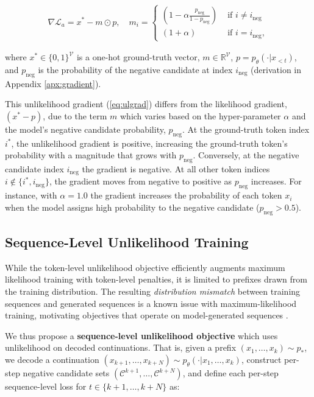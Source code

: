\begin{align}
\label{eq:ulgrad}
\nabla\mathcal{L}_a = x^* - m\odot p, \quad m_i =\begin{cases} (1-\alpha\frac{p_{\text{neg}}}{1-p_{\text{neg}}}) & \text{ if } i\neq i_{\text{neg}}\\
    (1+\alpha) & \text{ if } i=i_{\text{neg}},
    \end{cases} 
\end{align}

where $x^*\in\{0,1\}^\mathcal{V}$ is a one-hot ground-truth vector, $m\in \mathbb{R}^\mathcal{V}$, $p=p_{\theta}(\cdot|x_{<t})$, and $p_{\text{neg}}$ is the probability of the negative candidate at index $i_{\text{neg}}$ (derivation in Appendix \ref{apx:gradient}).

This unlikelihood gradient (\ref{eq:ulgrad}) differs from the likelihood gradient, $(x^*-p)$, due to the term $m$ which varies based on the hyper-parameter $\alpha$ and the model's negative candidate probability, $p_{\text{neg}}$. At the ground-truth token index $i^*$, the unlikelihood gradient is positive, increasing the ground-truth token's probability with a magnitude that grows with $p_{\text{neg}}$. Conversely, at the negative candidate index $i_{\text{neg}}$ the gradient is negative.  At all other token indices $i\not\in \{i^*,i_{\text{neg}}\}$, the gradient moves from negative to positive as $p_{\text{neg}}$ increases. For instance, with $\alpha=1.0$ the gradient increases the probability of each token $x_i$ when the model assigns high probability to the negative candidate ($p_{\text{neg}}>0.5$).

\subsection{Sequence-Level Unlikelihood Training}
\label{ssec:seq-obj} 

While the token-level unlikelihood objective efficiently augments maximum likelihood training with token-level penalties, it is limited to prefixes drawn from the training distribution. The resulting \textit{distribution mismatch} between training sequences and generated sequences is a known issue with maximum-likelihood training, motivating objectives that operate on model-generated sequences \citep{daume2009search,ross2011reduction,ranzato2015sequence,yu2016seqgan}.

We thus propose a \textbf{sequence-level unlikelihood objective} which uses unlikelihood on decoded continuations. That is, given a prefix $(x_1,\ldots,x_k)\sim p_*$, we decode a continuation $(x_{k+1},\ldots,x_{k+N})\sim p_{\theta}(\cdot | x_1,\ldots,x_k)$, construct per-step negative candidate sets $(\mathcal{C}^{k+1},\ldots,\mathcal{C}^{k+N})$, and define each per-step sequence-level loss for $t\in \{k+1,\ldots,k+N\}$ as:


